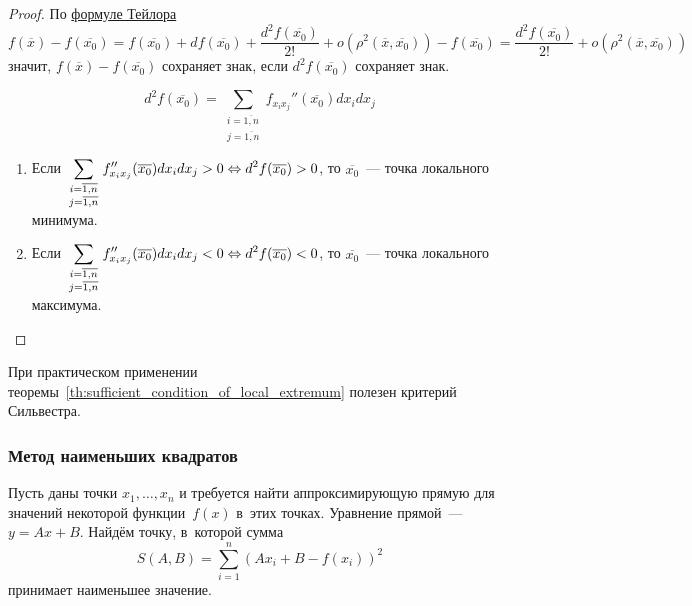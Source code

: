 \begin{proof}
По \hyperref[eq:Taylor_series_for_several_variables]{формуле Тейлора}
\begin{equation*}
f(\overline x) - f(\overline{x_0}) =
f(\overline{x_0}) + df(\overline{x_0}) + \frac{d^2 f(\overline{x_0})}{2!} + o(\rho^2(\overline x, \overline{x_0})) - f(\overline{x_0}) =
\frac{d^2 f(\overline{x_0})}{2!} + o(\rho^2(\overline x, \overline{x_0}))
\end{equation*}
значит, $f(\overline x) - f(\overline{x_0})$ сохраняет знак, если $d^2 f(\overline{x_0})$ сохраняет знак.
	
\begin{equation*}
d^2 f(\overline{x_0}) = \sum_{
\begin{smallmatrix}
i = \overline{1, n} \\
j = \overline{1, n}
\end{smallmatrix}
} f_{x_i x_j}''(\overline{x_0}) dx_i dx_j
\end{equation*}
	
\begin{enumerate}
	\item Если $\displaystyle \sum_{
	\begin{smallmatrix}
	i = \overline{1, n} \\
	j = \overline{1, n}
	\end{smallmatrix}
	} f_{x_i x_j}''(\overline{x_0}) dx_i dx_j > 0 \opbr\Leftrightarrow
	d^2 f(\overline{x_0}) > 0$, то $\overline{x_0}$~--- точка локального минимума.
	\item Если $\displaystyle \sum_{
	\begin{smallmatrix}
	i = \overline{1, n} \\
	j = \overline{1, n}
	\end{smallmatrix}
	} f_{x_i x_j}''(\overline{x_0}) dx_i dx_j < 0 \opbr\Leftrightarrow
	d^2 f(\overline{x_0}) < 0$, то $\overline{x_0}$~--- точка локального максимума.
\end{enumerate}
\end{proof}
	
При практическом применении теоремы~\ref*{th:sufficient_condition_of_local_extremum} полезен критерий Сильвестра.
	
\subsubsection{Метод наименьших квадратов}
Пусть даны точки $x_1, \ldots, x_n$ и требуется найти аппроксимирующую прямую для значений некоторой функции~$f(x)$ в~этих точках.
Уравнение прямой~--- $y = Ax + B$.
Найдём точку, в~которой сумма
\begin{equation*}
S(A, B) = \sum_{i=1}^n (A x_i + B - f(x_i))^2
\end{equation*}
принимает наименьшее значение.
	
